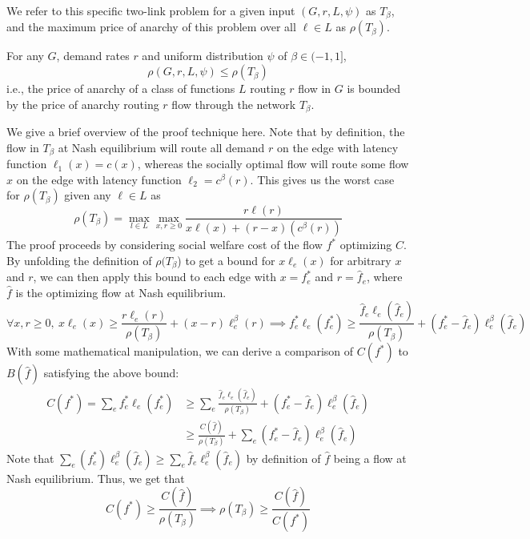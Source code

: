 We refer to this specific two-link problem for a given input $(G,r,L,\psi)$ as $T_\beta$, and the maximum price of anarchy of this problem over all $\ell \in L$ as $\rho(T_\beta)$.
\begin{theorem}
For any $G$, demand rates $r$ and uniform distribution $\psi$ of $\beta \in (-1, 1]$,
    $$\rho(G,r,{L},\psi) \le \rho(T_\beta)$$
   i.e., the price of anarchy of a class of functions $L$ routing $r$ flow in $G$ is 
    bounded by the price of anarchy routing $r$ flow through the network $T_\beta$.
    \end{theorem}
\begin{proof-sketch}
    We give a brief overview of the proof technique here.
    Note that by definition, 
    the flow in $T_\beta$ at Nash equilibrium will route all demand $r$ on the edge with latency function $\ell_1(x) = c(x)$, whereas the socially optimal flow will route some flow $x$ on the edge with latency function $\ell_2 = c^\beta(r)$. This gives us the worst case for $\rho(T_\beta)$ given any $\ell \in L$ as
    $$\rho(T_\beta) = \max_{l\in{L}} \max_{x,r\ge 0} \frac{r\ell(r)}{x\ell(x) + (r-x)(c^\beta(r))}$$
    The proof proceeds by considering social welfare cost of the flow $f^*$ optimizing $C$. By unfolding the definition of $\rho(T_\beta$) to get a bound for $x\ell_e(x)$ for arbitrary $x$ and $r$, we can then apply this bound to each edge with $x = f^*_e$ and $r = \hat{f}_e$, where $\hat{f}$ is the optimizing flow at Nash equilibrium. 
    $$\forall x,r\ge 0,~ x\ell_e(x) \ge \frac{r\ell_e(r)}{\rho(T_\beta)}  + (x-r)\ell^\beta_e(r)
    \implies  f^*_e\ell_e(f^*_e) \ge \frac{\hat{f}_e\ell_e(\hat{f}_e)}{\rho(T_\beta)}  + (f^*_e-\hat{f}_e)\ell^\beta_e(\hat{f}_e)$$
    With some mathematical manipulation, we can derive a comparison of $C(f^*)$ to $B(\hat{f})$ satisfying the above bound:
    \begin{align*}
        C(f^*) = \sum_e f^*_e\ell_e(f^*_e) &\ge \sum_e \frac{\hat{f}_e\ell_e(\hat{f}_e)}{\rho(T_\beta)} + (f^*_e-\hat{f}_e)\ell^\beta_e(\hat{f}_e)\\
        &\ge \frac{C(\hat{f})}{\rho(T_\beta)} + \sum_e (f^*_e-\hat{f}_e)\ell^\beta_e(\hat{f}_e)
    \end{align*}
    Note that $\sum_e (f^*_e) \ell^\beta_e(\hat{f}_e) \ge \sum_e \hat{f}_e\ell^\beta_e(\hat{f}_e)$ by definition of $\hat{f}$ being a flow at Nash equilibrium.
    Thus, we get that 
        $$C(f^*) \ge \frac{C(\hat{f})}{\rho(T_\beta)}\implies \rho(T_\beta) \ge \frac{C(\hat{f})}{C(f^*)}$$
\end{proof-sketch}

